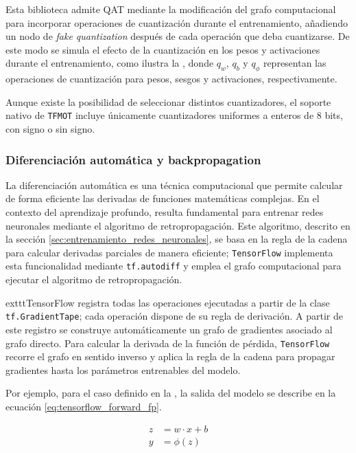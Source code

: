 Esta biblioteca admite QAT mediante la modificación del grafo computacional para incorporar operaciones de cuantización durante el entrenamiento, añadiendo un nodo de \textit{fake quantization} después de cada operación que deba cuantizarse. De este modo se simula el efecto de la cuantización en los pesos y activaciones durante el entrenamiento, como ilustra la , donde $q_w$, $q_b$ y $q_\phi$ representan las operaciones de cuantización para pesos, sesgos y activaciones, respectivamente.


Aunque existe la posibilidad de seleccionar distintos cuantizadores, el soporte nativo de \texttt{TFMOT} incluye únicamente cuantizadores uniformes a enteros de 8 bits, con signo o sin signo.

\subsubsection{Diferenciación automática y backpropagation}
La diferenciación automática es una técnica computacional que permite calcular de forma eficiente las derivadas de funciones matemáticas complejas. En el contexto del aprendizaje profundo, resulta fundamental para entrenar redes neuronales mediante el algoritmo de retropropagación. Este algoritmo, descrito en la sección \ref{sec:entrenamiento_redes_neuronales}, se basa en la regla de la cadena para calcular derivadas parciales de manera eficiente; \texttt{TensorFlow} implementa esta funcionalidad mediante \texttt{tf.autodiff} y emplea el grafo computacional para ejecutar el algoritmo de retropropagación.

	exttt{TensorFlow} registra todas las operaciones ejecutadas a partir de la clase \texttt{tf.\allowbreak{}GradientTape}; cada operación dispone de su regla de derivación. A partir de este registro se construye automáticamente un grafo de gradientes asociado al grafo directo. Para calcular la derivada de la función de pérdida, \texttt{TensorFlow} recorre el grafo en sentido inverso y aplica la regla de la cadena para propagar gradientes hasta los parámetros entrenables del modelo.

Por ejemplo, para el caso definido en la , la salida del modelo se describe en la ecuación \ref{eq:tensorflow_forward_fp}.

\begin{equation}
    \label{eq:tensorflow_forward_fp}
    \begin{aligned}
        z &= w \cdot x + b \\
        y &= \phi(z)
    \end{aligned}
\end{equation}

